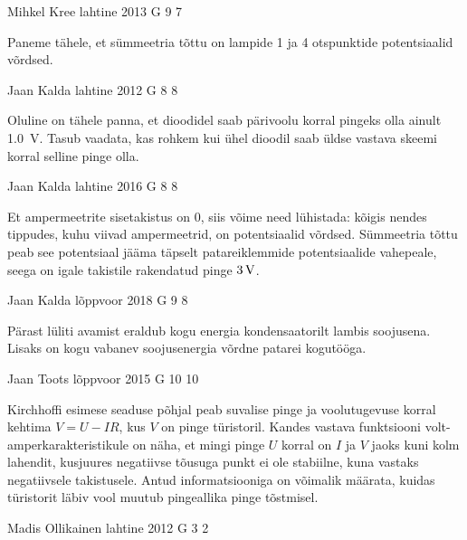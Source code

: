 \documentclass[11pt]{article}
\begin{document}
{%
{Mihkel Kree} %
{lahtine} %
{2013} %
{G 9} %
{7} %
{

\ifHint
Paneme tähele, et sümmeetria tõttu on lampide 1 ja 4 otspunktide potentsiaalid võrdsed.
\fi
}

{Jaan Kalda} %
{lahtine} %
{2012} %
{G 8} %
{8} %
{

\ifHint
Oluline on tähele panna, et dioodidel saab pärivoolu korral pingeks olla ainult \SI{1,0}{V}. Tasub vaadata, kas rohkem kui ühel dioodil saab üldse vastava skeemi korral selline pinge olla.
\fi
}

{Jaan Kalda} %
{lahtine} %
{2016} %
{G 8} %
{8} %
{

\ifHint
Et ampermeetrite sisetakistus on \num{0}, siis võime need lühistada: kõigis nendes tippudes, kuhu viivad ampermeetrid, on potentsiaalid võrdsed. Sümmeetria tõttu peab see 
potentsiaal jääma täpselt patareiklemmide potentsiaalide vahepeale, seega on igale takistile rakendatud pinge
$\SI 3V$.
\fi
}

{Jaan Kalda} %
{lõppvoor} %
{2018} %
{G 9} %
{8} %
{

\ifHint
Pärast lüliti avamist eraldub kogu energia kondensaatorilt lambis soojusena. Lisaks on kogu vabanev soojusenergia võrdne patarei kogutööga.
\fi
}

{Jaan Toots} %
{lõppvoor} %
{2015} %
{G 10} %
{10} %
{

\ifHint
Kirchhoffi esimese seaduse põhjal peab suvalise pinge ja voolutugevuse korral kehtima $V = U - IR$, kus $V$ on pinge türistoril. Kandes vastava funktsiooni volt-amperkarakteristikule on näha, et mingi pinge $U$ korral on $I$ ja $V$ jaoks kuni kolm lahendit, kusjuures negatiivse tõusuga punkt ei ole stabiilne, kuna vastaks negatiivsele takistusele. Antud informatsiooniga on võimalik määrata, kuidas türistorit läbiv vool muutub pingeallika pinge tõstmisel.
\fi
}

{Madis Ollikainen} %
{lahtine} %
{2012} %
{G 3} %
{2} %
{

}}
\end{document}
